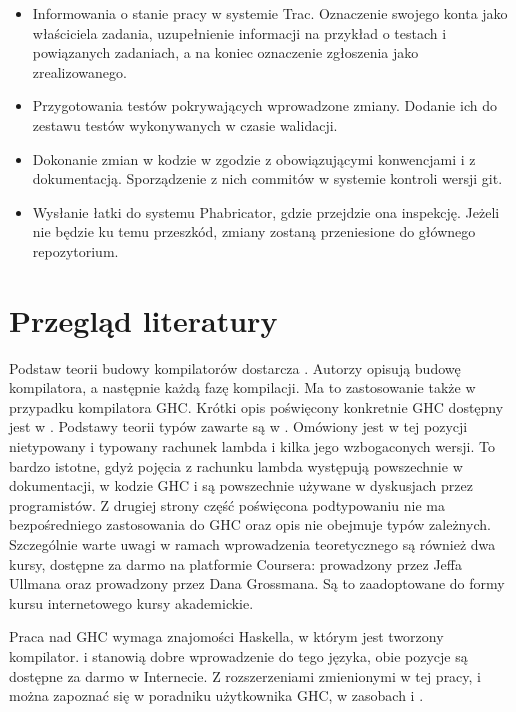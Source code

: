 \begin{itemize}
  \item Informowania o stanie pracy w systemie Trac. Oznaczenie swojego konta jako właściciela zadania, uzupełnienie informacji na przykład o testach i powiązanych zadaniach, a na koniec oznaczenie zgłoszenia jako zrealizowanego.
  \item Przygotowania testów pokrywających wprowadzone zmiany. Dodanie ich do zestawu testów wykonywanych w czasie walidacji.
  \item Dokonanie zmian w kodzie w zgodzie z obowiązującymi konwencjami i z dokumentacją. Sporządzenie z nich commitów w systemie kontroli wersji git.
  \item Wysłanie łatki do systemu Phabricator, gdzie przejdzie ona inspekcję. Jeżeli nie będzie ku temu przeszkód, zmiany zostaną przeniesione do głównego repozytorium.
\end{itemize}

\section{Przegląd literatury}\label{sec:przeglad_literatury}

Podstaw teorii budowy kompilatorów dostarcza \cite{Dragon}. Autorzy opisują budowę kompilatora, a następnie każdą fazę kompilacji. Ma to zastosowanie także w przypadku kompilatora GHC. Krótki opis poświęcony konkretnie GHC dostępny jest w \cite{AOSA}. Podstawy teorii typów zawarte są w \cite{TAPL}. Omówiony jest w tej pozycji nietypowany i typowany rachunek lambda i kilka jego wzbogaconych wersji. To bardzo istotne, gdyż pojęcia z rachunku lambda występują powszechnie w dokumentacji, w kodzie GHC i są powszechnie używane w dyskusjach przez programistów. Z drugiej strony część poświęcona podtypowaniu nie ma bezpośredniego zastosowania do GHC oraz opis nie obejmuje typów zależnych. Szczególnie warte uwagi w ramach wprowadzenia teoretycznego są również dwa kursy, dostępne za darmo na platformie Coursera:  prowadzony przez Jeffa Ullmana oraz  prowadzony przez Dana Grossmana. Są to zaadoptowane do formy kursu internetowego kursy akademickie.

Praca nad GHC wymaga znajomości Haskella, w którym jest tworzony kompilator. \cite{LearnYouAHaskell} i \cite{RealWorldHaskell} stanowią dobre wprowadzenie do tego języka, obie pozycje są dostępne za darmo w Internecie. Z rozszerzeniami zmienionymi w tej pracy,  i  można zapoznać się w poradniku użytkownika GHC, w zasobach \cite{GuideTypeFamilies} i \cite{GuidePartialTypeSignatures}.

